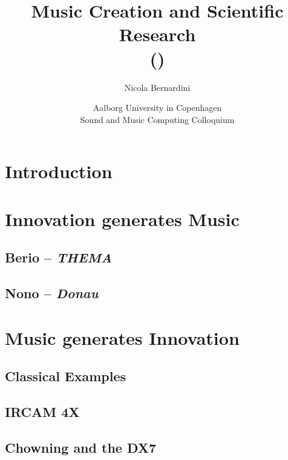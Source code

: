 \documentclass[\printmode,compress]{beamer}
\title[Music Creation and Scientific Research]
{%
    Music Creation and Scientific Research\\
	{\tiny (\rcstag)}
}
\author{%
	Nicola Bernardini\\
    \href{mailto:\cpholderemail}{\cpholderemail}
}
\institute[SMERM]%
{%
	\href{http://www.conservatoriosantacecilia.it}
		 {Conservatorio di Musica ``S.Cecilia'' -- Roma}
}
\date[Copenhagen, 20/11/2015]{Aalborg University in Copenhagen\\Sound and Music Computing Colloquium}
\begin{document}
  
\begin{frame}
	\titlepage
\end{frame}



\section{Introduction}



\section[Innovation $\Rightarrow$ Music]{Innovation generates Music}

\subsection{Berio -- {\it THEMA}}



\subsection{Nono -- {\it Donau}}



\section[Music $\Rightarrow$ Innovation]{Music generates Innovation}

\subsection[Classics]{Classical Examples}



\subsection[4X]{IRCAM 4X}



\subsection[DX7]{Chowning and the DX7}


\end{document}
